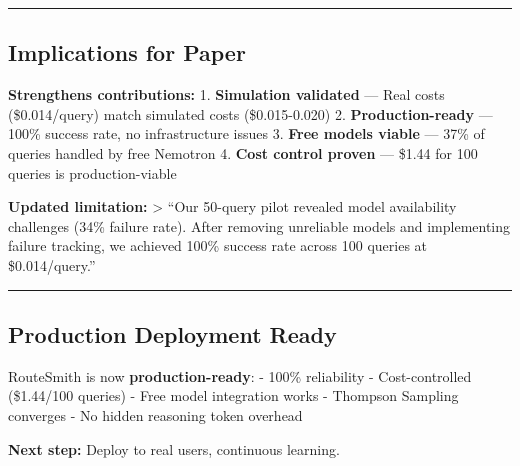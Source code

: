 \documentclass[
  11pt,
]{article}
\begin{document}
\begin{center}\rule{0.5\linewidth}{0.5pt}\end{center}

\hypertarget{implications-for-paper}{%
\subsection{Implications for Paper}\label{implications-for-paper}}

\textbf{Strengthens contributions:} 1. \textbf{Simulation validated} ---
Real costs (\$0.014/query) match simulated costs (\$0.015-0.020) 2.
\textbf{Production-ready} --- 100\% success rate, no infrastructure
issues 3. \textbf{Free models viable} --- 37\% of queries handled by
free Nemotron 4. \textbf{Cost control proven} --- \$1.44 for 100 queries
is production-viable

\textbf{Updated limitation:} \textgreater{} ``Our 50-query pilot
revealed model availability challenges (34\% failure rate). After
removing unreliable models and implementing failure tracking, we
achieved 100\% success rate across 100 queries at \$0.014/query.''

\begin{center}\rule{0.5\linewidth}{0.5pt}\end{center}

\hypertarget{production-deployment-ready}{%
\subsection{Production Deployment
Ready}\label{production-deployment-ready}}

RouteSmith is now \textbf{production-ready}: - 100\% reliability -
Cost-controlled (\$1.44/100 queries) - Free model integration works -
Thompson Sampling converges - No hidden reasoning token overhead

\textbf{Next step:} Deploy to real users, continuous learning.
\end{document}
